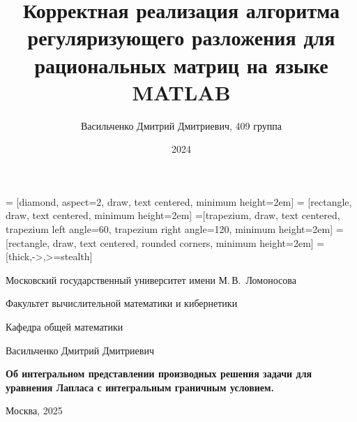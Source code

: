 \documentclass[10pt,pdf,hyperref={unicode}]{beamer}
\institute{МГУ им. М.В.Ломоносова}
\title[]{Корректная реализация алгоритма регуляризующего разложения для рациональных матриц на языке MATLAB}
\author[Васильченко  Д.Д.]{Васильченко Дмитрий Дмитриевич, 409 группа}
\date{2024}
\begin{document}
 = [diamond, aspect=2, draw, text centered, minimum height=2em]
 = [rectangle, draw, text centered, minimum height=2em]
=[trapezium, draw, text centered, trapezium left angle=60, trapezium right angle=120, minimum height=2em]
 = [rectangle, draw, text centered, rounded corners, minimum height=2em]
 = [thick,->,>=stealth]
\begin{frame}
\begin{center}%
Московский государственный университет имени М.\,В.~Ломоносова
    
    Факультет вычислительной математики и кибернетики
    
    Кафедра общей математики
  \end{center}%
  \vfill%
  \begin{center}%
    \large%
    Васильченко Дмитрий Дмитриевич
    
    \vspace{.5cm}
    
    \Large
    \textbf{ Об интегральном представлении производных решения задачи для уравнения Лапласа с интегральным граничным условием.}
  \end{center}%
  \vfill
  \vfill%
  \vfill%
  \vfill%
  \vfill%
  \begin{center}%
    Москва, 2025%
  \end{center}%
\end{frame}
\end{document}

